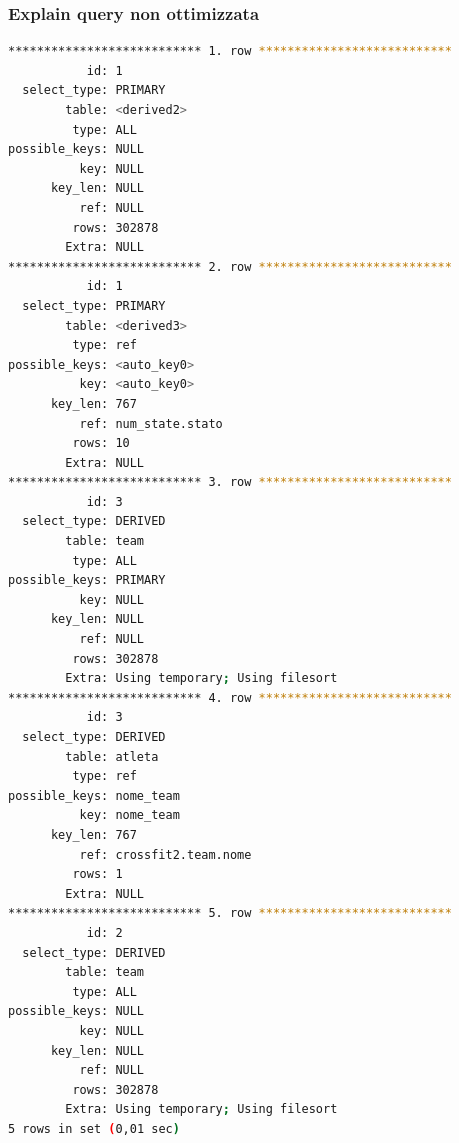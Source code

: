 \documentclass[12pt,a4paper]{article}
\begin{document}
\subsubsection{Explain query non ottimizzata}
\begin{lstlisting}[language=Bash]
*************************** 1. row ***************************
           id: 1
  select_type: PRIMARY
        table: <derived2>
         type: ALL
possible_keys: NULL
          key: NULL
      key_len: NULL
          ref: NULL
         rows: 302878
        Extra: NULL
*************************** 2. row ***************************
           id: 1
  select_type: PRIMARY
        table: <derived3>
         type: ref
possible_keys: <auto_key0>
          key: <auto_key0>
      key_len: 767
          ref: num_state.stato
         rows: 10
        Extra: NULL
*************************** 3. row ***************************
           id: 3
  select_type: DERIVED
        table: team
         type: ALL
possible_keys: PRIMARY
          key: NULL
      key_len: NULL
          ref: NULL
         rows: 302878
        Extra: Using temporary; Using filesort
*************************** 4. row ***************************
           id: 3
  select_type: DERIVED
        table: atleta
         type: ref
possible_keys: nome_team
          key: nome_team
      key_len: 767
          ref: crossfit2.team.nome
         rows: 1
        Extra: NULL
*************************** 5. row ***************************
           id: 2
  select_type: DERIVED
        table: team
         type: ALL
possible_keys: NULL
          key: NULL
      key_len: NULL
          ref: NULL
         rows: 302878
        Extra: Using temporary; Using filesort
5 rows in set (0,01 sec)
\end{lstlisting}
\end{document}

